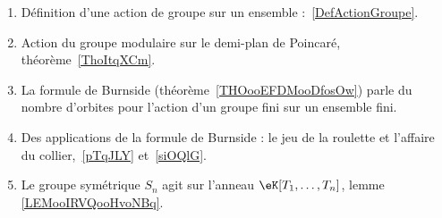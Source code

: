 
        \label{THEMEooKZHBooRCULcr}
\begin{enumerate}
    \item Définition d'une action de groupe sur un ensemble :~\ref{DefActionGroupe}.
    \item Action du groupe modulaire sur le demi-plan de Poincaré, théorème~\ref{ThoItqXCm}.
    \item
        La formule de Burnside (théorème~\ref{THOooEFDMooDfosOw}) parle du nombre d'orbites pour l'action d'un groupe fini sur un ensemble fini.
    \item Des applications de la formule de Burnside : le jeu de la roulette et l'affaire du collier,~\ref{pTqJLY} et~\ref{siOQlG}.
    \item
        Le groupe symétrique  \( S_n\) agit sur l'anneau \( \eK[T_1,\ldots, T_n]\), lemme \ref{LEMooIRVQooHvoNBq}.
\end{enumerate}
